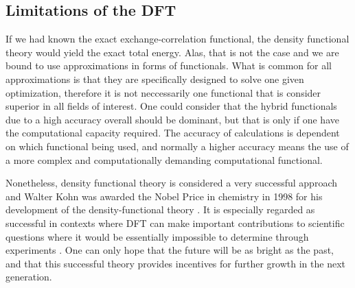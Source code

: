 \subsection{Limitations of the DFT}

If we had known the exact exchange-correlation functional, the density functional theory would yield the exact total energy. Alas, that is not the case and we are bound to use approximations in forms of functionals. What is common for all approximations is that they are specifically designed to solve one given optimization, therefore it is not neccessarily one functional that is consider superior in all fields of interest. One could consider that the hybrid functionals due to a high accuracy overall should be dominant, but that is only if one have the computational capacity required. The accuracy of calculations is dependent on which functional being used, and normally a higher accuracy means the use of a more complex and computationally demanding computational functional.

Nonetheless, density functional theory is considered a very successful approach and Walter Kohn was awarded the Nobel Price in chemistry in 1998 for his development of the density-functional theory \cite{Freitas1999}. It is especially regarded as successful in contexts where DFT can make important contributions to scientific questions where it would be essentially impossible to determine through experiments \cite{DavidSholl2009}. One can only hope that the future will be as bright as the past, and that this successful theory provides incentives for further growth in the next generation.


